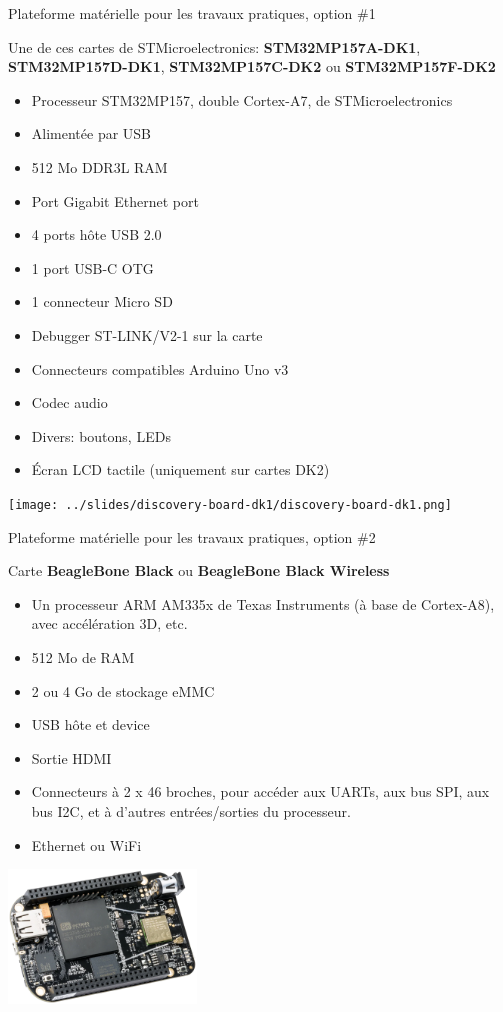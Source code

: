 \documentclass[a4paper,12pt,obeyspaces,spaces,hyphens]{article}
\begin{document}
\feagendatwocolumn
{Plateforme matérielle pour les travaux pratiques, option \#1}
{
  Une de ces cartes de STMicroelectronics: {\bf
  STM32MP157A-DK1}, {\bf STM32MP157D-DK1}, {\bf STM32MP157C-DK2} ou
  {\bf STM32MP157F-DK2}
  \begin{itemize}
  \item Processeur STM32MP157, double Cortex-A7, de STMicroelectronics
  \item Alimentée par USB
  \item 512 Mo DDR3L RAM
  \item Port Gigabit Ethernet port
  \item 4 ports hôte USB 2.0
  \item 1 port USB-C OTG
  \item 1 connecteur Micro SD
  \item Debugger ST-LINK/V2-1 sur la carte
  \item Connecteurs compatibles Arduino Uno v3
  \item Codec audio
  \item Divers: boutons, LEDs
  \item Écran LCD tactile (uniquement sur cartes DK2)
  \end{itemize}
}
{}
{
  \begin{center}
    \texttt{[image: ../slides/discovery-board-dk1/discovery-board-dk1.png]}
  \end{center}
}

\feagendatwocolumn
{Plateforme matérielle pour les travaux pratiques, option \#2}
{
  Carte {\bf BeagleBone Black} ou {\bf BeagleBone Black Wireless}
  \begin{itemize}
  \item Un processeur ARM AM335x de Texas Instruments (à base de
    Cortex-A8), avec accélération 3D, etc.
  \item 512 Mo de RAM
  \item 2 ou 4 Go de stockage eMMC
  \item USB hôte et device
  \item Sortie HDMI
  \item Connecteurs à 2 x 46 broches, pour accéder aux UARTs, aux bus
    SPI, aux bus I2C, et à d'autres entrées/sorties du processeur.
  \item Ethernet ou WiFi
  \end{itemize}
}
{}
{
  \begin{center}
    \includegraphics[width=5cm]{../slides/beagleboneblack-board/beagleboneblack.png}
  \end{center}
}
\end{document}
